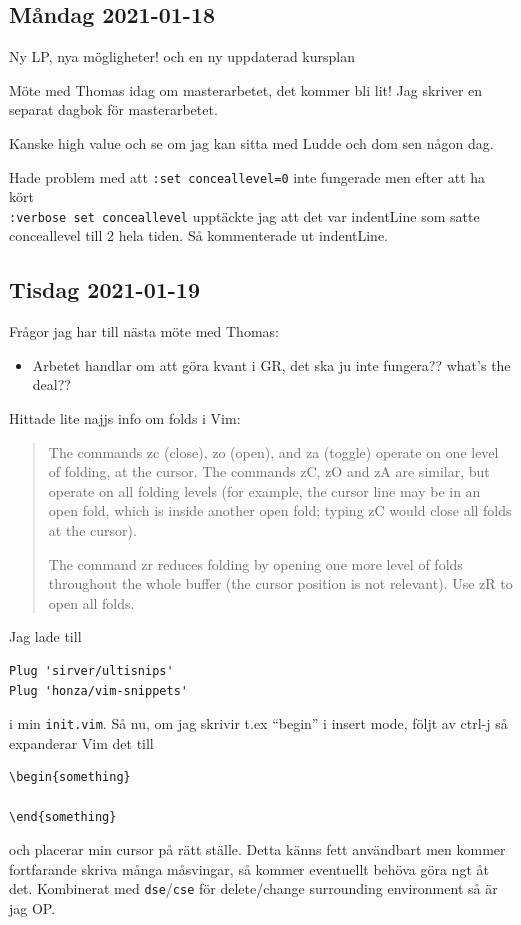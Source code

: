 
\subsection{Måndag 2021-01-18}
Ny LP, nya mögligheter! och en ny uppdaterad kursplan


Möte med Thomas idag om masterarbetet, det kommer bli lit! Jag skriver en separat dagbok för masterarbetet.

\bigskip

Kanske high value och se om jag kan sitta med Ludde och dom sen någon dag.

\bigskip

Hade problem med att \verb|:set conceallevel=0| inte fungerade men efter att ha kört\\
\verb|:verbose set conceallevel| upptäckte jag att det var indentLine som satte conceallevel till 2 hela tiden. Så kommenterade ut indentLine.


\subsection{Tisdag 2021-01-19}

Frågor jag har till nästa möte med Thomas:
\begin{itemize}
	\item Arbetet handlar om att göra kvant i GR, det ska ju inte fungera?? what's the deal??
\end{itemize}

\bigskip

Hittade lite najjs info om folds i Vim:
\begin{quote}
The commands zc (close), zo (open), and za (toggle) operate on one level of folding, at the cursor. The commands zC, zO and zA are similar, but operate on all folding levels (for example, the cursor line may be in an open fold, which is inside another open fold; typing zC would close all folds at the cursor).

The command zr reduces folding by opening one more level of folds throughout the whole buffer (the cursor position is not relevant). Use zR to open all folds.
\end{quote}

\bigskip

Jag lade till 
\begin{verbatim}
Plug 'sirver/ultisnips'
Plug 'honza/vim-snippets'
\end{verbatim}
i min \verb|init.vim|. Så nu, om jag skrivir t.ex \enquote{begin} i insert mode, följt av ctrl-j så expanderar Vim det till
\begin{verbatim}
\begin{something}
	
\end{something}
\end{verbatim}
och placerar min cursor på rätt ställe. Detta känns fett användbart men kommer fortfarande skriva många måsvingar, så kommer eventuellt behöva göra ngt åt det. Kombinerat med \verb|dse|/\verb|cse| för delete/change surrounding environment så är jag OP.

